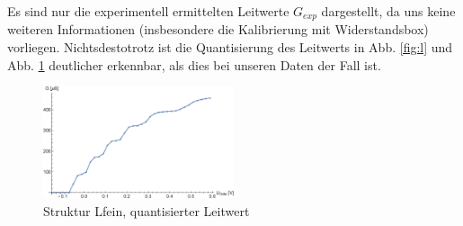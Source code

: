 \documentclass[aps,twocolumn,secnumarabic,nobalancelastpage,amsmath,amssymb,
nofootinbib,superscriptaddress]{revtex4-1}
\begin{document}
\newpage
Es sind nur die experimentell ermittelten Leitwerte $G_{exp}$ dargestellt, da uns
keine weiteren Informationen (insbesondere die Kalibrierung mit Widerstandsbox)
vorliegen. Nichtsdestotrotz ist die Quantisierung des Leitwerts in Abb. \ref{fig:l}
und Abb. \ref{fig:lfein} deutlicher erkennbar, als dies bei unseren Daten der Fall ist.

\begin{figure}[h]
  \centering
  \includegraphics[width=0.5\textwidth]{Berechnung-Bilder/lfein.eps}
  \caption{Struktur Lfein, quantisierter Leitwert}
  \label{fig:lfein}
\end{figure}


\end{document}

